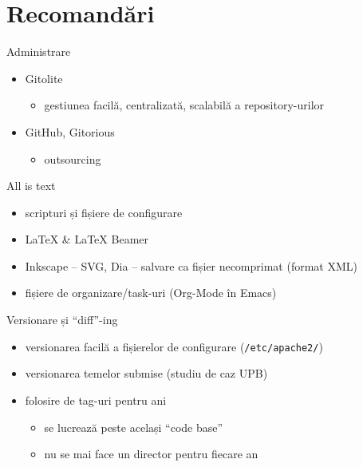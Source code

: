 \documentclass{beamer}
\begin{document}
\section{Recomandări}

\begin{frame}{Administrare}
  \begin{itemize}
    \item Gitolite
      \begin{itemize}
        \item gestiunea facilă, centralizată, scalabilă a repository-urilor
      \end{itemize}
    \item GitHub, Gitorious
      \begin{itemize}
        \item outsourcing
      \end{itemize}
  \end{itemize}
\end{frame}

\begin{frame}{All is text}
	\begin{itemize}
		\item scripturi și fișiere de configurare
		\item LaTeX \& LaTeX Beamer
		\item Inkscape -- SVG, Dia -- salvare ca fișier necomprimat (format
		XML)
		\item fișiere de organizare/task-uri (Org-Mode în Emacs)
	\end{itemize}
\end{frame}

\begin{frame}{Versionare și ``diff''-ing}
	\begin{itemize}
		\item versionarea facilă a fișierelor de configurare
		(\texttt{/etc/apache2/})
		\item versionarea temelor submise (studiu de caz UPB)
		\item folosire de tag-uri pentru ani
			\begin{itemize}
				\item se lucrează peste același ``code base''
				\item nu se mai face un director pentru fiecare an
			\end{itemize}
	\end{itemize}
\end{frame}
\end{document}
